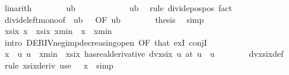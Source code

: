 \begin{isabellebody}
\ linarith\isanewline
\isanewline
\ \ \isamarkupfalse%
\ {\isachardoublequoteopen}{}\ {\isacharslash}{\kern0pt}\ {\isasymxi}\ {\isasymle}\ ub{\isachardoublequoteclose}\isanewline
\ \ \isamarkupfalse%
{\isacharminus}{\kern0pt}\isanewline
\ \ \ \ \isamarkupfalse%
\ {\isachardoublequoteopen}{}\ {\isacharless}{\kern0pt}\ {\isasymxi}\ {\isacharslash}{\kern0pt}\ ub{\isachardoublequoteclose}\ \isamarkupfalse%
\ {\isacharparenleft}{\kern0pt}rule\ divide{\isacharunderscore}{\kern0pt}pos{\isacharunderscore}{\kern0pt}pos{\isacharparenright}{\kern0pt}\ fact{\isacharplus}{\kern0pt}\isanewline
\ \ \ \ \isamarkupfalse%
\ divide{\isacharunderscore}{\kern0pt}left{\isacharunderscore}{\kern0pt}mono{\isacharbrackleft}{\kern0pt}of\ {\isachardoublequoteopen}{}{\isacharslash}{\kern0pt}\ ub{\isachardoublequoteclose}\ {\isasymxi}\ {}{\isacharcomma}{\kern0pt}\ OF\ {\isacartoucheopen}{}{\isacharslash}{\kern0pt}ub\ {\isasymle}\ {\isasymxi}{\isacartoucheclose}{\isacharbrackright}{\kern0pt}\isanewline
\ \ \ \ \isamarkupfalse%
\ {\isacharquery}{\kern0pt}thesis\ \isamarkupfalse%
\ simp\isanewline
\ \ \isamarkupfalse%
\isanewline
\ \isanewline
\ \ \isamarkupfalse%
\ {\isachardoublequoteopen}xsix\ x\ {\isachargreater}{\kern0pt}\ xsix\ xmin{\isachardoublequoteclose}\ \ {\isachardoublequoteopen}x\ {\isacharless}{\kern0pt}\ xmin{\isachardoublequoteclose}\isanewline
\ \ \isamarkupfalse%
\ {\isacharparenleft}{\kern0pt}intro\ DERIV{\isacharunderscore}{\kern0pt}neg{\isacharunderscore}{\kern0pt}imp{\isacharunderscore}{\kern0pt}decreasing{\isacharunderscore}{\kern0pt}open\ {\isacharbrackleft}{\kern0pt}OF\ that{\isacharbrackright}{\kern0pt}\ exI\ conjI{\isacharparenright}{\kern0pt}\isanewline
\ \ \ \ \isamarkupfalse%
\ {\isachardoublequoteopen}{\isasymlbrakk}x\ {\isacharless}{\kern0pt}\ u{\isacharsemicolon}{\kern0pt}\ u\ {\isacharless}{\kern0pt}\ xmin{\isasymrbrakk}\ {\isasymLongrightarrow}\ {\isacharparenleft}{\kern0pt}xsix\ has{\isacharunderscore}{\kern0pt}real{\isacharunderscore}{\kern0pt}derivative\ dvxsix\ u{\isacharparenright}{\kern0pt}\ {\isacharparenleft}{\kern0pt}at\ u{\isacharparenright}{\kern0pt}{\isachardoublequoteclose}\ \ u\isanewline
\ \ \ \ \ \ \isamarkupfalse%
\ dvxsix{\isacharunderscore}{\kern0pt}def\ \isamarkupfalse%
\ {\isacharparenleft}{\kern0pt}rule\ xsix{\isacharunderscore}{\kern0pt}deriv{\isacharparenright}{\kern0pt}\ {\isacharparenleft}{\kern0pt}use\ {\isacartoucheopen}{}\ {\isacharless}{\kern0pt}\ x{\isacartoucheclose}\ \ simp{\isacharparenright}{\kern0pt}\isanewline

\end{isabellebody}
